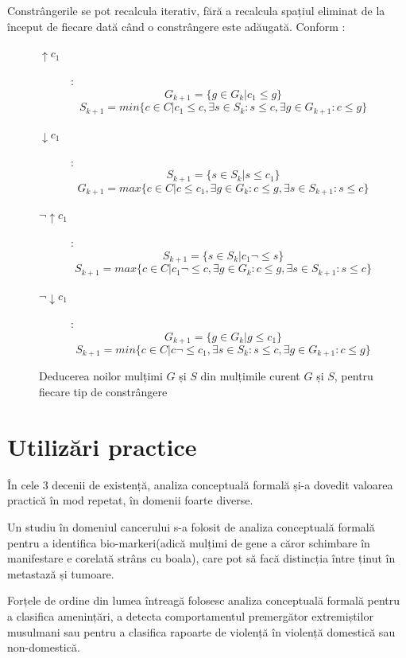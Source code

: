 \documentclass[12pt, a4paper, twoside, romanian]{teza-upb}
\begin{document}
  Constrângerile se pot recalcula iterativ, fără a recalcula spațiul eliminat de la început de fiecare dată când o constrângere este adăugată. Conform \cite{Carpineto:2004:CDA:975252}:
  \begin{figure}[h!]
    \centering
    \begin{description}
        \item [$\uparrow c_1$]:
          $$
          G_{k+1} = \{ g \in G_k | c_1 \le g \}
          $$ $$
          S_{k+1} = min\{c \in C | c_1 \le c, \exists s \in S_k : s \le c, \exists g \in G_{k+1} : c \le g\}
          $$
        \item [$\downarrow c_1$]:
          $$
          S_{k+1} = \{ s \in S_k | s \le c_1\} 
          $$ $$
          G_{k+1} = max\{c \in C | c \le c_1, \exists g \in G_k : c \le g, \exists s \in S_{k+1}: s \le c\}
          $$
        \item [$\neg\uparrow c_1$]:
          $$
          S_{k+1} = \{ s \in S_k | c_1 \neg\le s \}
          $$ $$
          S_{k+1} = max\{c \in C | c_1 \neg\le c, \exists g \in G_k : c \le g, \exists s \in S_{k+1} : s \le c\}
          $$
        \item [$\neg\downarrow c_1$]:
          $$
          G_{k+1} = \{ g \in G_k | g \le c_1\} 
          $$ $$
          S_{k+1} = min\{c \in C | c \neg\le c_1, \exists s \in S_k : s \le c, \exists g \in G_{k+1}: c \le g\}
          $$
    \end{description}
    \caption{Deducerea noilor mulțimi $G$ și $S$ din mulțimile curent $G$ și $S$, pentru fiecare tip de constrângere}
    \end{figure}


  \section{Utilizări practice}
  \label{sec:utilizari-practice}

    În cele 3 decenii de existență, analiza conceptuală formală și-a dovedit valoarea practică în mod repetat, în domenii foarte diverse.

    Un studiu în domeniul cancerului s-a folosit de analiza conceptuală formală pentru a identifica  bio-markeri(adică mulțimi de gene a căror schimbare în manifestare e corelată strâns cu boala), care pot să facă distincția între ținut în metastază și tumoare.\cite{fca:cancer}

    Forțele de ordine din lumea întreagă folosesc analiza conceptuală formală pentru a clasifica amenințări\cite{voss2002advanced}, a detecta comportamentul premergător extremiștilor musulmani \cite{elzinga2010terrorist} sau pentru a clasifica rapoarte de violență în violență domestică sau non-domestică.
\end{document}
